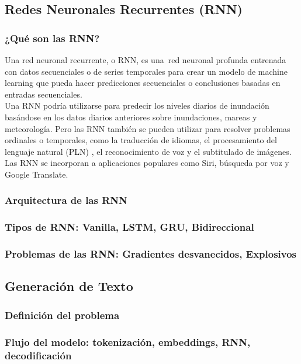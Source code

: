 \documentclass{article}
\begin{document}
\subsection{Redes Neuronales Recurrentes (RNN)}
\subsubsection{¿Qué son las RNN?}
Una red neuronal recurrente, o RNN, es una red neuronal \cite{ibm-nn} profunda entrenada con datos secuenciales o de series temporales para crear un modelo de machine learning \cite{ibm-ml} que pueda hacer predicciones secuenciales o conclusiones basadas en entradas secuenciales. \\

Una RNN podría utilizarse para predecir los niveles diarios de inundación basándose en los datos diarios anteriores sobre inundaciones, mareas y meteorología.
Pero las RNN también se pueden utilizar para resolver problemas ordinales o temporales, como la traducción de idiomas, el procesamiento del lenguaje natural (PLN) \cite{ibm-pln}, el reconocimiento de voz \cite{ibm-sr} y el subtitulado de imágenes.
Las RNN se incorporan a aplicaciones populares como Siri, búsqueda por voz y Google Translate.

\subsubsection{Arquitectura de las RNN}
\subsubsection{Tipos de RNN: Vanilla, LSTM, GRU, Bidireccional}
\subsubsection{Problemas de las RNN: Gradientes desvanecidos, Explosivos}

\subsection{Generación de Texto}
\subsubsection{Definición del problema}
\subsubsection{Flujo del modelo: tokenización, embeddings, RNN, decodificación}
\end{document}
